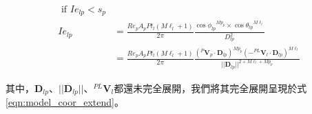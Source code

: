                 \begin{equation}
                    \label{eqn:model_coor}
                    \begin{aligned}
                        \text { if } Ie_{lp}<s_p \\
                        Ie_{lp} &= \frac{Re_pA_pPt_l(M\ell_{l}+1)}{2 \pi} \frac{ {\cos\phi_{lp}}^{Mp_{p}} \times{\cos \theta_{lp}}^{M\ell_{l}}}{D^2_{lp}}\\
                            & = \frac{Re_pA_pPt_l(M\ell_{l}+1)}{2 \pi} \frac{ {{(^{P}\boldsymbol{V}_p \cdot {\boldsymbol{D}_{lp}})}}^{Mp_{p}} {(-^{PL}\boldsymbol{V}_l \cdot {\boldsymbol{D}_{lp}})}^{M\ell_{l}}}  {{||{\boldsymbol{D}_{lp}}||}^{2+M\ell_l+Mp_p}}
                    \end{aligned}
                \end{equation}
        
                \qquad
                其中，${\boldsymbol{D}_{lp}}$、$||{\boldsymbol{D}_{lp}}||$、$^{PL}\boldsymbol{V}_l$都還未完全展開，我們將其完全展開呈現於式\ref{eqn:model_coor_extend}。
        
